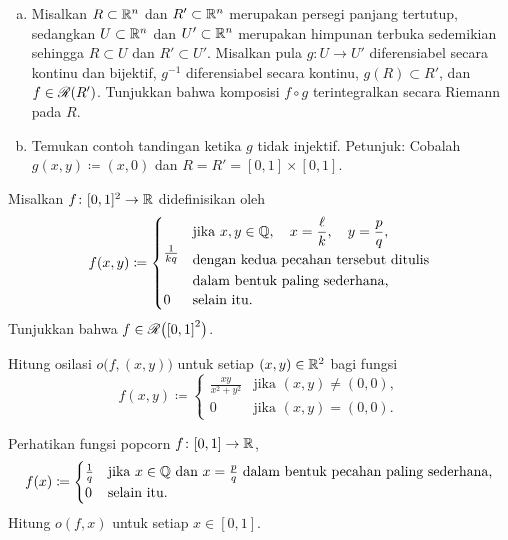 \begin{exercise}
\leavevmode
\begin{enumerate}[a)]
\item
Misalkan $R \subset {\mathbb{R}}^n$ dan $R' \subset {\mathbb{R}}^n$ merupakan persegi panjang
tertutup, sedangkan $U \subset {\mathbb{R}}^n$ dan $U' \subset {\mathbb{R}}^n$ merupakan himpunan
terbuka sedemikian sehingga $R \subset U$ dan $R' \subset U'$.
Misalkan pula $g \colon U \to U'$ diferensiabel secara kontinu dan bijektif,
$g^{-1}$ diferensiabel secara kontinu, $g(R) \subset R'$, dan
$f \in {\mathscr{R}}(R')$. Tunjukkan bahwa komposisi $f \circ g$ terintegralkan secara
Riemann pada $R$.
\item
Temukan contoh tandingan ketika $g$ tidak injektif.
Petunjuk: Cobalah $g(x,y) \coloneqq (x,0)$ dan
$R=R'=[0,1] \times [0,1]$.
\end{enumerate}
\end{exercise}

\begin{exercise}
Misalkan
$f \colon [0,1]^2 \to {\mathbb{R}}$ didefinisikan oleh
\begin{equation*}
f(x,y) \coloneqq
\begin{cases}
\frac{1}{kq} &
\begin{aligned}
&\text{jika } x,y \in {\mathbb{Q}}, \quad x = \frac{\ell}{k}, \quad y=\frac{p}{q}, \\
&\text{dengan kedua pecahan tersebut ditulis} \\
&\text{dalam bentuk paling sederhana,}
\end{aligned} \\
0            & \text{selain itu.}
\end{cases}
\end{equation*}
Tunjukkan bahwa $f \in {\mathscr{R}}\bigl({[0,1]}^2\bigr)$.
\end{exercise}

\begin{exercise}
Hitung osilasi $o\bigl(f,(x,y)\bigr)$ untuk setiap $(x,y) \in {\mathbb{R}}^2$ bagi fungsi
\begin{equation*}
f(x,y) \coloneqq
\begin{cases}
\frac{xy}{x^2+y^2} & \text{jika } (x,y) \neq (0,0), \\
0                  & \text{jika } (x,y) = (0,0) .
\end{cases}
\end{equation*}
\end{exercise}

\begin{exercise}
Perhatikan fungsi popcorn $f \colon [0,1] \to {\mathbb{R}}$,
\begin{equation*}
f(x) \coloneqq
\begin{cases}
\frac{1}{q} & \text{jika } x \in {\mathbb{Q}} \text{ dan } x = \frac{p}{q}
 \text{ dalam bentuk pecahan paling sederhana,} \\
0           & \text{selain itu.}
\end{cases}
\end{equation*}
Hitung $o(f,x)$ untuk setiap $x \in [0,1]$.
\end{exercise}

